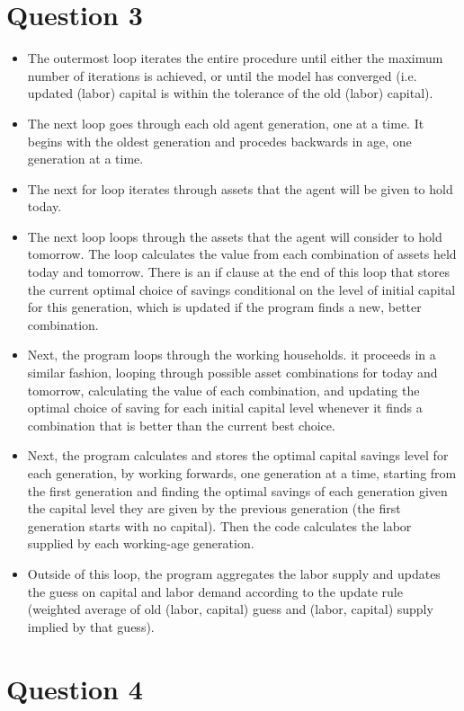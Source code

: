 \documentclass[11pt]{article} %
\begin{document}
\section{Question 3}
\begin{itemize}
\item
The outermost loop iterates the entire procedure until either the maximum number of iterations is achieved, or until the model has converged (i.e. updated (labor) capital is within the tolerance of the old (labor) capital).
\item
The next loop goes through each old agent generation, one at a time. It begins with the oldest generation and procedes backwards in age, one generation at a time.
\item 
The next for loop iterates through assets that the agent will be given to hold today.
\item
The next loop loops through the assets that the agent will consider to hold tomorrow. The loop calculates the value from each combination of assets held today and tomorrow. There is an if clause at the end of this loop that stores the current optimal choice of savings conditional on the level of initial capital for this generation, which is updated if the program finds a new, better combination.
\item Next, the program loops through the working households. it proceeds in a similar fashion, looping through possible asset combinations for today and tomorrow, calculating the value of each combination, and updating the optimal choice of saving for each initial capital level whenever it finds a combination that is better than the current best choice.
\item Next, the program calculates and stores the optimal capital savings level for each generation, by working forwards, one generation at a time, starting from the first generation and finding the optimal savings of each generation given the capital level they are given by the previous generation (the first generation starts with no capital). Then the code calculates the labor supplied by each working-age generation.
\item Outside of this loop, the program aggregates the labor supply and updates the guess on capital and labor demand according to the update rule (weighted average of old (labor, capital) guess and (labor, capital) supply implied by that guess).
\end{itemize}
\section{Question 4}
\end{document}
